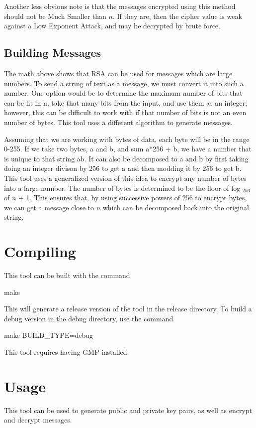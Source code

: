 Another less obvious note is that the messages encrypted using this method should not be Much Smaller than $ n $. If they are, then the cipher value is weak against a Low Exponent Attack, and may be decrypted by brute force.\hypertarget{rsa_messages_rsa}{}\subsection{Building Messages}\label{rsa_messages_rsa}
The math above shows that R\+SA can be used for messages which are large numbers. To send a string of text as a message, we must convert it into such a number. One option would be to determine the maximum number of bits that can be fit in n, take that many bits from the input, and use them as an integer; however, this can be difficult to work with if that number of bits is not an even number of bytes. This tool uses a different algorithm to generate messages.

Assuming that we are working with bytes of data, each byte will be in the range 0-\/255. If we take two bytes, a and b, and sum a$\ast$256 + b, we have a number that is unique to that string ab. It can also be decomposed to a and b by first taking doing an integer divison by 256 to get a and then modding it by 256 to get b. This tool uses a generalized version of this idea to encrypt any number of bytes into a large number. The number of bytes is determined to be the floor of log $_256$ of $ n $ + 1. This ensures that, by using successive powers of 256 to encrypt bytes, we can get a message close to $ n $ which can be decomposed back into the original string.\hypertarget{rsa_compile_rsa}{}\section{Compiling}\label{rsa_compile_rsa}
This tool can be built with the command \begin{DoxyVerb}make
\end{DoxyVerb}
 This will generate a release version of the tool in the release directory. To build a debug version in the debug directory, use the command \begin{DoxyVerb}make BUILD_TYPE=debug
\end{DoxyVerb}


This tool requires having G\+MP installed.\hypertarget{rsa_usage_rsa}{}\section{Usage}\label{rsa_usage_rsa}
This tool can be used to generate public and private key pairs, as well as encrypt and decrypt messages.

